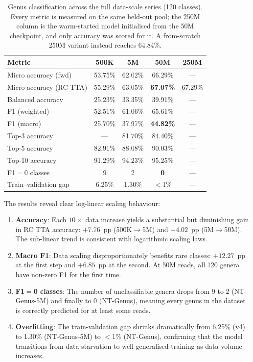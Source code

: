 \begin{table}[htbp]
    \centering
    \caption{Genus classification across the full data-scale series (120 classes). Every metric is measured on the same held-out pool; the 250M column is the warm-started model initialised from the 50M checkpoint, and only accuracy was scored for it. A from-scratch 250M variant instead reaches 64.84\%.}
    \label{tab:scaling}
    \small
    \begin{tabular}{lcccc}
        \toprule
        \textbf{Metric} & \textbf{500K} & \textbf{5M} & \textbf{50M} & \textbf{250M} \\
        \midrule
        Micro accuracy (fwd)    & 53.75\% & 62.02\% & 66.29\%          & --- \\
        Micro accuracy (RC TTA) & 55.29\% & 63.05\% & \textbf{67.07\%} & 67.29\% \\
        Balanced accuracy       & 25.23\% & 33.35\% & 39.91\%          & --- \\
        F1 (weighted)           & 52.51\% & 61.06\% & 65.61\%          & --- \\
        F1 (macro)              & 25.70\% & 37.97\% & \textbf{44.82\%} & --- \\
        Top-3 accuracy          & ---     & 81.70\% & 84.40\%          & --- \\
        Top-5 accuracy          & 82.91\% & 88.08\% & 90.03\%          & --- \\
        Top-10 accuracy         & 91.29\% & 94.23\% & 95.25\%          & --- \\
        F1$=$0 classes          & 9       & 2       & \textbf{0}       & --- \\
        Train--validation gap   & 6.25\%  & 1.30\%  & $<$1\%           & --- \\
        \bottomrule
    \end{tabular}
\end{table}

The results reveal clear log-linear scaling behaviour:
\begin{enumerate}
    \item \textbf{Accuracy}: Each $10\times$ data increase yields a substantial but diminishing gain in RC TTA accuracy: $+7.76$~pp (500K$\to$5M) and $+4.02$~pp (5M$\to$50M). The sub-linear trend is consistent with logarithmic scaling laws.
    \item \textbf{Macro F1}: Data scaling disproportionately benefits rare classes: $+12.27$~pp at the first step and $+6.85$~pp at the second. At 50M reads, all 120 genera have non-zero F1 for the first time.
    \item \textbf{F1$=$0 classes}: The number of unclassifiable genera drops from 9 to 2 (NT-Genus-5M) and finally to 0 (NT-Genus), meaning every genus in the dataset is correctly predicted for at least some reads.
    \item \textbf{Overfitting}: The train-validation gap shrinks dramatically from 6.25\% (v4) to 1.30\% (NT-Genus-5M) to $<$1\% (NT-Genus), confirming that the model transitions from data starvation to well-generalised training as data volume increases.
\end{enumerate}

